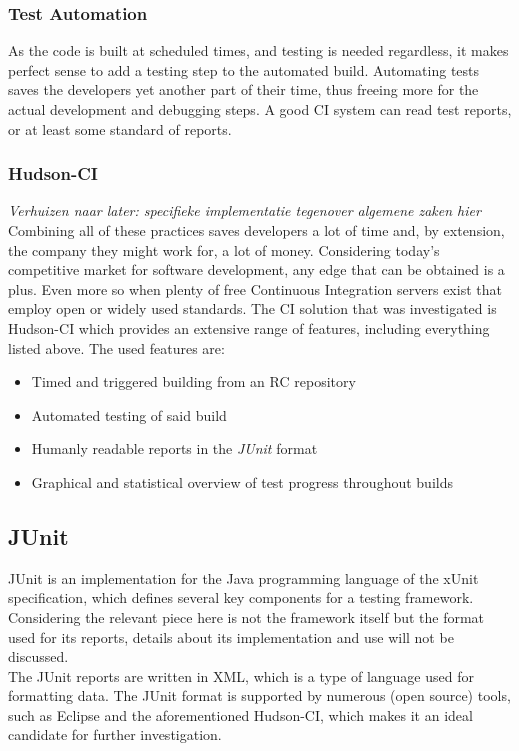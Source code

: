 \documentclass[11pt,british]{article}
\begin{document}
\subsubsection{Test Automation}
As the code is built at scheduled times, and testing is needed regardless, it makes perfect sense to add a testing step to the automated build. Automating tests saves the developers yet another part of their time, thus freeing more for the actual development and debugging steps. A good \gls{CI} system can read test reports, or at least some standard of reports. 

\subsubsection{Hudson-CI}
\emph{\color{red}Verhuizen naar later: specifieke implementatie tegenover algemene zaken hier}
Combining all of these practices saves developers a lot of time and, by extension, the company they might work for, a lot of money. Considering today's competitive market for software development, any edge that can be obtained is a plus. Even more so when plenty of free Continuous Integration servers exist that employ open or widely used standards. The \gls{CI} solution that was investigated is Hudson-CI which provides an extensive range of features, including everything listed above. The used features are:
\begin{itemize}
\item Timed and triggered building from an \gls{RC} repository
\item Automated testing of said build
\item Humanly readable reports in the \emph{JUnit} format
\item Graphical and statistical overview of test progress throughout builds
\end{itemize}

\subsection{JUnit}
\label{subsec:JUnit}
JUnit is an implementation for the Java programming language of the xUnit specification, which defines several key components for a testing framework. Considering the relevant piece here is not the framework itself but the format used for its reports, details about its implementation and use will not be discussed.\\
The JUnit reports are written in \gls{XML}, which is a type of language used for formatting data. The JUnit format is supported by numerous (open source) tools, such as Eclipse and the aforementioned Hudson-CI, which makes it an ideal candidate for further investigation. 
\end{document}

